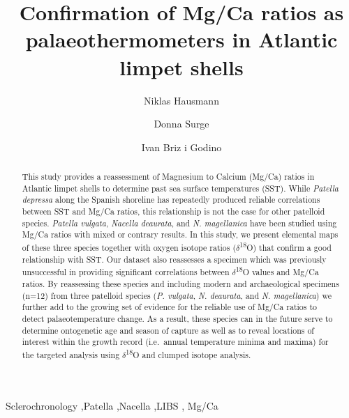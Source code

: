 \documentclass[
  authoryear,
  preprint,
  3p]{elsarticle}
\begin{document}
\begin{frontmatter}
\title{Confirmation of Mg/Ca ratios as palaeothermometers in Atlantic
limpet shells}
\author[1]{Niklas Hausmann%
%
}
\author[2]{Donna Surge%
%
}

\author[3]{Ivan Briz i Godino%
%
}






        
\begin{abstract}
This study provides a reassessment of Magnesium to Calcium (Mg/Ca)
ratios in Atlantic limpet shells to determine past sea surface
temperatures (SST). While \emph{Patella depressa} along the Spanish
shoreline has repeatedly produced reliable correlations between SST and
Mg/Ca ratios, this relationship is not the case for other patelloid
species. \emph{Patella vulgata}, \emph{Nacella deaurata}, and \emph{N.
magellanica} have been studied using Mg/Ca ratios with mixed or contrary
results. In this study, we present elemental maps of these three species
together with oxygen isotope ratios (\(\delta\)\textsuperscript{18}O)
that confirm a good relationship with SST. Our dataset also reassesses a
specimen which was previously unsuccessful in providing significant
correlations between \(\delta\)\textsuperscript{18}O values and Mg/Ca
ratios. By reassessing these species and including modern and
archaeological specimens (n=12) from three patelloid species (\emph{P.
vulgata}, \emph{N. deaurata}, and \emph{N. magellanica}) we further add
to the growing set of evidence for the reliable use of Mg/Ca ratios to
detect palaeotemperature change. As a result, these species can in the
future serve to determine ontogenetic age and season of capture as well
as to reveal locations of interest within the growth record (i.e.~annual
temperature minima and maxima) for the targeted analysis using
\(\delta\)\textsuperscript{18}O and clumped isotope analysis.
\end{abstract}





\begin{keyword}
    Sclerochronology \sep Patella \sep Nacella \sep LIBS \sep 
    Mg/Ca
\end{keyword}
\end{frontmatter}
    
\end{document}
